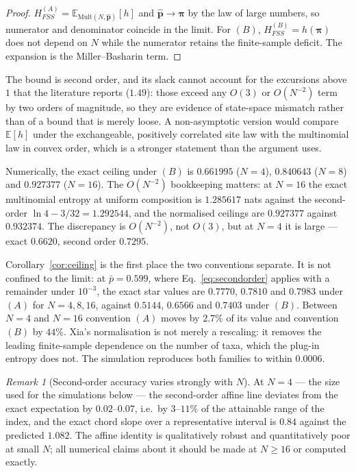 \documentclass[11pt]{article}
\newcommand{\HFSS}{H_{FSS}}
\newcommand{\bpi}{\boldsymbol{\pi}}
\newcommand{\E}{\mathbb{E}}
\newcommand{\Mult}{\mathrm{Mult}}
\theoremstyle{definition}
\theoremstyle{remark}
\newtheorem{remark}[theorem]{Remark}
\begin{document}
\begin{proof}
$\HFSS^{(A)}=\E_{\Mult(N,\hat{\mathbf p})}[h]$ and
$\hat{\mathbf p}\to\bpi$ by the law of large numbers, so numerator and
denominator coincide in the limit. For $(B)$, $\HFSS^{(B)}=h(\bpi)$ does not
depend on $N$ while the numerator retains the finite-sample deficit. The
expansion is the Miller--Basharin term.
\end{proof}

The bound is second order, and its slack cannot account for the excursions
above $1$ that the literature reports ($1.49$): those exceed any $O(3)$ or
$O(N^{-2})$ term by two orders of magnitude, so they are evidence of
state-space mismatch rather than of a bound that is merely loose. A
non-asymptotic version would compare $\E[h]$ under the exchangeable,
positively correlated site law with the multinomial law in convex order,
which is a stronger statement than the argument uses.

Numerically, the exact ceiling under $(B)$ is $0.661995$ ($N=4$), $0.840643$
($N=8$) and $0.927377$ ($N=16$). The $O(N^{-2})$ bookkeeping matters: at
$N=16$ the exact multinomial entropy at uniform composition is $1.285617$ nats
against the second-order $\ln4-3/32=1.292544$, and the normalised ceilings are
$0.927377$ against $0.932374$. The discrepancy is $O(N^{-2})$, not $O(3)$, but
at $N=4$ it is large --- exact $0.6620$, second order $0.7295$.

Corollary~\ref{cor:ceiling} is the first place the two conventions separate.
It is not confined to the limit: at $\bar p=0.599$, where
Eq.~\eqref{eq:secondorder} applies with a remainder under $10^{-3}$, the exact
star values are $0.7770$, $0.7810$ and $0.7983$ under $(A)$ for $N=4,8,16$,
against $0.5144$, $0.6566$ and $0.7403$ under $(B)$. Between $N=4$ and $N=16$
convention $(A)$ moves by $2.7\%$ of its value and convention $(B)$ by $44\%$.
Xia's normalisation is not merely a rescaling: it removes the leading
finite-sample dependence on the number of taxa, which the plug-in entropy does
not. The simulation reproduces both families to within $0.0006$.

\begin{remark}[Second-order accuracy varies strongly with $N$]
\label{rem:accuracy}
At $N=4$ --- the size used for the simulations below --- the second-order
affine line deviates from the exact expectation by $0.02$--$0.07$, i.e.\ by
$3$--$11\%$ of the attainable range of the index, and the exact chord slope
over a representative interval is $0.84$ against the predicted $1.082$. The
affine identity is qualitatively robust and quantitatively poor at small $N$;
all numerical claims about it should be made at $N\ge16$ or computed exactly.
\end{remark}
\end{document}
